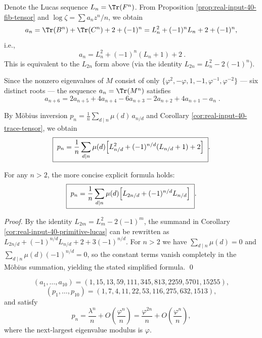 \begin{corollary}\label{cor:real-input-40-trace-tensor}
Denote the Lucas sequence $L_n=\Tr(F^n)$. From Proposition \ref{prop:real-input-40-fib-tensor} and $\log\zeta=\sum a_n z^n/n$, we obtain
\[
a_n=\Tr(B^n)+\Tr(C^n)+2+(-1)^n
=L_n^2+(-1)^nL_n+2+(-1)^n,
\]
i.e.,
\[
\boxed{\ a_n=L_n^2+(-1)^n(L_n+1)+2\ }.
\]
This is equivalent to the $L_{2n}$ form above (via the identity $L_{2n}=L_n^2-2(-1)^n$).
\end{corollary}

\begin{corollary}\label{cor:real-input-40-trace-recurrence}
Since the nonzero eigenvalues of $M$ consist of only
\(
\{\varphi^2,-\varphi,1,-1,\varphi^{-1},\varphi^{-2}\}
\)
--- six distinct roots --- the sequence $a_n=\Tr(M^n)$ satisfies
\[
\boxed{\;
a_{n+6}=2a_{n+5}+4a_{n+4}-6a_{n+3}-2a_{n+2}+4a_{n+1}-a_n\;}.
\]
\end{corollary}

\begin{corollary}\label{cor:real-input-40-primitive-lucas}
By M\"obius inversion
\(
p_n=\frac{1}{n}\sum_{d\mid n}\mu(d)\,a_{n/d}
\)
and Corollary \ref{cor:real-input-40-trace-tensor}, we obtain
\[
\boxed{\;
p_n=\frac{1}{n}\sum_{d\mid n}\mu(d)\Bigl[L_{n/d}^2+(-1)^{n/d}(L_{n/d}+1)+2\Bigr]\; }.
\]
\end{corollary}

\begin{corollary}\label{cor:real-input-40-primitive-lucas-simplified}
For any $n>2$, the more concise explicit formula holds:
\[
\boxed{\;
p_n=\frac{1}{n}\sum_{d\mid n}\mu(d)\Bigl[L_{2n/d}+(-1)^{n/d}L_{n/d}\Bigr]\; }.
\]
\end{corollary}
\begin{proof}
By the identity $L_{2m}=L_m^2-2(-1)^m$, the summand in Corollary \ref{cor:real-input-40-primitive-lucas} can be rewritten as
\(
L_{2n/d}+(-1)^{n/d}L_{n/d}+2+3(-1)^{n/d}
\).
For $n>2$ we have
\(
\sum_{d\mid n}\mu(d)=0
\)
and
\(
\sum_{d\mid n}\mu(d)(-1)^{n/d}=0
\),
so the constant terms vanish completely in the M\"obius summation, yielding the stated simplified formula. \qed
\end{proof}
\[
(a_1,\dots,a_{10})=(1,15,13,59,111,345,813,2259,5701,15255),
\]
\[
(p_1,\dots,p_{10})=(1,7,4,11,22,53,116,275,632,1513),
\]
and satisfy
\[
p_n=\frac{\lambda^n}{n}+O\!\left(\frac{\varphi^n}{n}\right)
=\frac{\varphi^{2n}}{n}+O\!\left(\frac{\varphi^n}{n}\right),
\]
where the next-largest eigenvalue modulus is $\varphi$.
